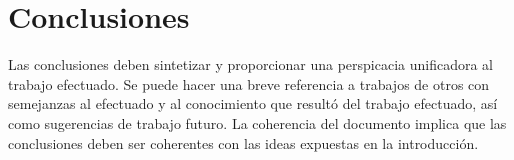 \chapter{Conclusiones}\label{cap:conclusions}

Las conclusiones deben sintetizar y proporcionar una perspicacia unificadora al trabajo efectuado. Se puede hacer una breve referencia a trabajos de otros con semejanzas al efectuado y al conocimiento que resultó del trabajo efectuado, así como sugerencias de trabajo futuro. La coherencia del documento implica que las conclusiones deben ser coherentes con las ideas expuestas en la introducción.